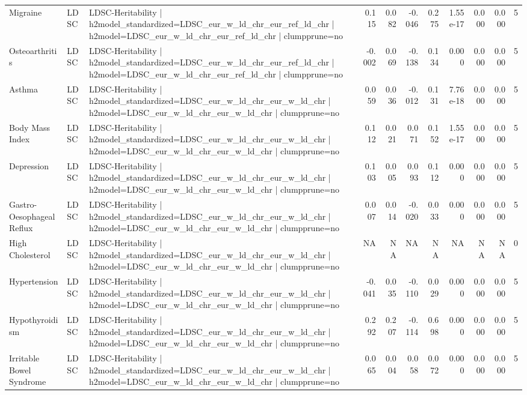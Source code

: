 \begin{landscape}
\begin{longtable}{p{2.4cm}p{1.8cm}p{6.0cm}rrrrrrrr}
Migraine & LDSC & LDSC-Heritability | h2model\_standardized=LDSC\_eur\_w\_ld\_chr\_eur\_ref\_ld\_chr | h2model=LDSC\_eur\_w\_ld\_chr\_eur\_ref\_ld\_chr | clumpprune=no & 0.115 & 0.082 & -0.046 & 0.275 & 1.55e-17 & 0.000 & 0.000 & 5 \\
Osteoarthritis & LDSC & LDSC-Heritability | h2model\_standardized=LDSC\_eur\_w\_ld\_chr\_eur\_ref\_ld\_chr | h2model=LDSC\_eur\_w\_ld\_chr\_eur\_ref\_ld\_chr | clumpprune=no & -0.002 & 0.069 & -0.138 & 0.134 & 0.000 & 0.000 & 0.000 & 5 \\
Asthma & LDSC & LDSC-Heritability | h2model\_standardized=LDSC\_eur\_w\_ld\_chr\_eur\_w\_ld\_chr | h2model=LDSC\_eur\_w\_ld\_chr\_eur\_w\_ld\_chr | clumpprune=no & 0.059 & 0.036 & -0.012 & 0.131 & 7.76e-18 & 0.000 & 0.000 & 5 \\
Body Mass Index & LDSC & LDSC-Heritability | h2model\_standardized=LDSC\_eur\_w\_ld\_chr\_eur\_w\_ld\_chr | h2model=LDSC\_eur\_w\_ld\_chr\_eur\_w\_ld\_chr | clumpprune=no & 0.112 & 0.021 & 0.071 & 0.152 & 1.55e-17 & 0.000 & 0.000 & 5 \\
Depression & LDSC & LDSC-Heritability | h2model\_standardized=LDSC\_eur\_w\_ld\_chr\_eur\_w\_ld\_chr | h2model=LDSC\_eur\_w\_ld\_chr\_eur\_w\_ld\_chr | clumpprune=no & 0.103 & 0.005 & 0.093 & 0.112 & 0.000 & 0.000 & 0.000 & 5 \\
Gastro-Oesophageal Reflux & LDSC & LDSC-Heritability | h2model\_standardized=LDSC\_eur\_w\_ld\_chr\_eur\_w\_ld\_chr | h2model=LDSC\_eur\_w\_ld\_chr\_eur\_w\_ld\_chr | clumpprune=no & 0.007 & 0.014 & -0.020 & 0.033 & 0.000 & 0.000 & 0.000 & 5 \\
High Cholesterol & LDSC & LDSC-Heritability | h2model\_standardized=LDSC\_eur\_w\_ld\_chr\_eur\_w\_ld\_chr | h2model=LDSC\_eur\_w\_ld\_chr\_eur\_w\_ld\_chr | clumpprune=no & NA & NA & NA & NA & NA & NA & NA & 0 \\
Hypertension & LDSC & LDSC-Heritability | h2model\_standardized=LDSC\_eur\_w\_ld\_chr\_eur\_w\_ld\_chr | h2model=LDSC\_eur\_w\_ld\_chr\_eur\_w\_ld\_chr | clumpprune=no & -0.041 & 0.035 & -0.110 & 0.029 & 0.000 & 0.000 & 0.000 & 5 \\
Hypothyroidism & LDSC & LDSC-Heritability | h2model\_standardized=LDSC\_eur\_w\_ld\_chr\_eur\_w\_ld\_chr | h2model=LDSC\_eur\_w\_ld\_chr\_eur\_w\_ld\_chr | clumpprune=no & 0.292 & 0.207 & -0.114 & 0.698 & 0.000 & 0.000 & 0.000 & 5 \\
Irritable Bowel Syndrome & LDSC & LDSC-Heritability | h2model\_standardized=LDSC\_eur\_w\_ld\_chr\_eur\_w\_ld\_chr | h2model=LDSC\_eur\_w\_ld\_chr\_eur\_w\_ld\_chr | clumpprune=no & 0.065 & 0.004 & 0.058 & 0.072 & 0.000 & 0.000 & 0.000 & 5 \\

\end{longtable}
\end{landscape}
